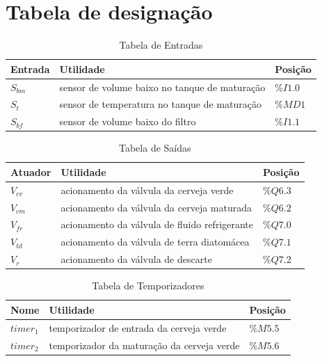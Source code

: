 \documentclass[twoside,twocolumn, 12pt]{paper}
\begin{document}
\section {Tabela de designação}
\begin{table}[b]
	\caption{Tabela de Entradas}
	\label{tab:in}
	\centering
	\begin{tabular}{|  p{2cm} | p{10cm} | p{2cm} | }
		\hline
		Entrada & Utilidade & Posição\\
		\hline
		$S_{bm}$ & sensor de volume baixo no tanque de maturação & $\%I1.0$ \\
		$S_t$ & sensor de temperatura no tanque de maturação & $\%MD1$ \\
		$S_{bf}$ & sensor de volume baixo do filtro & $\%I1.1$ \\
		\hline
	\end{tabular}
\end{table}


\begin{table}[b]
	\caption{Tabela de Saídas}
	\label{tab:out}
	\centering
	\begin{tabular}{|  p{2cm} | p{10cm} | p{2cm} | }
		\hline
		Atuador & Utilidade & Posição\\
		\hline
  		$V_{cv}$ & acionamento da válvula da cerveja verde & $\%Q6.3$ \\
  		$V_{cm}$ & acionamento da válvula da cerveja maturada & $\%Q6.2$ \\
 		$V_{fr}$ & acionamento da válvula de fluido refrigerante & $\%Q7.0$ \\
		$V_{td}$ & acionamento da válvula de terra diatomácea & $\%Q7.1$ \\
		$V_r$ & acionamento da válvula de descarte & $\%Q7.2$ \\
 		\hline
	\end{tabular}
\end{table}


\begin{table}[b]
	\caption{Tabela de Temporizadores}
	\label{tab:temp}
	\centering
	\begin{tabular}{|  p{2cm} | p{10cm} | p{2cm} | }
		\hline
		Nome & Utilidade & Posição\\
		\hline
		$timer_1$ &  temporizador de entrada da cerveja verde & $\%M5.5$ \\
		$timer_2$ & temporizador da maturação da cerveja verde & $\%M5.6$ \\
		 \hline
	\end{tabular}
\end{table}
\end{document}

